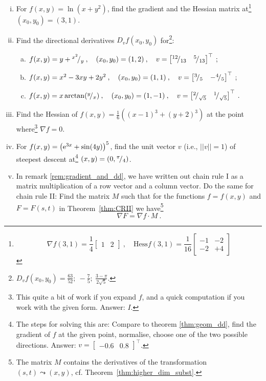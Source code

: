 \begin{exercise}
\begin{enumerate}[(i)]
	\item For $f(x,y) = \ln(x+y^2)$, find the gradient and the Hessian matrix at\footnote{
	\[\nabla f(3,1) = \frac{1}{4}\begin{bmatrix} 1 & 2 \end{bmatrix} \:, \quad
	 \mathrm{Hess}f(3,1)=\frac{1}{16}\begin{bmatrix} -1 & -2 \\ -2 & +4 \end{bmatrix} \]}
	$(x_0,y_0)=(3,1)$.
	\item Find the directional derivatives $D_vf(x_0,y_0)$ for\footnote{
	$D_vf(x_0,y_0)=\tfrac{63}{52};\:-\tfrac{7}{5};\:\tfrac{3-\pi}{2\sqrt{5}}.$}:
	\begin{enumerate}[(a)]
		\item $f(x,y)=y+{}^{x^2}\!/_{y}\:,\quad (x_0,y_0)=(1,2)\:,\quad
		v = \begin{bmatrix} {}^{12}\!/_{13} & {}^{5}\!/_{13}\end{bmatrix}^\top \:;$
		\item $f(x,y)=x^2-3xy+2y^2\:,\quad (x_0,y_0)=(1,1)\:,\quad
		v = \begin{bmatrix} {}^{3}\!/_{5} & -{}^{4}\!/_{5}\end{bmatrix}^\top \:;$
		\item $f(x,y)=x\arctan({}^{y}\!/_{x})\:,\quad (x_0,y_0)=(1,-1)\:,\quad
		v = \begin{bmatrix} {}^{2}\!/_{\sqrt{5}} & {}^{1}\!/_{\sqrt{5}}\end{bmatrix}^\top \:.$
	\end{enumerate}
	\item Find the Hessian of $f(x,y)=\tfrac16\left((x-1)^3+(y+2)^3\right)$ at the point where\footnote{This quite a bit of work if you expand $f$, and a quick computation if you work with the given form. Answer: $I$.} $\nabla f=0$.
	\item For $f(x,y) = \left(\mathrm{e}^{3x}+\sin(4y) \right)^{5}$, find the unit vector $v$ (i.e., $||v||=1$) of steepest descent at\footnote{The steps for solving this are: Compare to theorem \ref{thm:geom_dd}, find the gradient of $f$ at the given point, normalise, choose one of the two possible directions.	Answer: $ v = \begin{bmatrix} -0.6 & 0.8 \end{bmatrix}^{\top}$.}
	$(x,y)=(0,{}^{\pi}\!/_{4})$.
	\item In remark \ref{rem:gradient_and_dd}, we have written out chain rule I as a matrix multiplication of a row vector and a column vector. Do the same for chain rule II: Find the matrix $M$ such that for the functions $f=f(x,y)$ and $F=F(s,t)$ in Theorem~\ref{thm:CRII} we have\footnote{The matrix $M$ contains the derivatives of the transformation $(s,t)\leadsto(x,y)$, cf. Theorem~\ref{thm:higher_dim_subst}.}
	\[  \nabla F = \nabla f \cdot M \:. \]
\end{enumerate}
\end{exercise}


